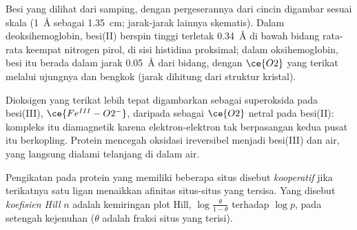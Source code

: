 \begin{omfigure}

{\small Besi  yang dilihat dari samping, dengan pergeserannya dari cincin digambar sesuai
skala (1~\AA{} sebagai 1.35~cm; jarak-jarak lainnya skematis). Dalam deoksihemoglobin, besi(II) berspin tinggi terletak
\qty{0.34}{\angstrom} di bawah bidang rata-rata keempat nitrogen pirol, di sisi
histidina proksimal; dalam oksihemoglobin, besi itu berada dalam jarak \qty{0.05}{\angstrom} dari bidang, dengan $\ce{O2}$
yang terikat melalui ujungnya dan bengkok (jarak dihitung dari struktur kristal).}
\end{omfigure}

Dioksigen yang terikat lebih tepat digambarkan sebagai superoksida pada besi(III), $\ce{Fe^{III}-O2^-}$, daripada
sebagai $\ce{O2}$ netral pada besi(II): kompleks itu diamagnetik karena elektron-elektron
tak berpasangan kedua pusat itu berkopling. Protein mencegah oksidasi
ireversibel menjadi besi(III) dan air, yang langsung dialami  telanjang di dalam
air.

\begin{definition}\label{def:b3:bioinorganic:cooperativity}
Pengikatan pada protein yang memiliki beberapa situs disebut \emph{kooperatif}
jika terikatnya satu ligan menaikkan afinitas situs-situs
yang tersisa. Yang disebut \emph{koefisien Hill} $n$ adalah kemiringan
plot Hill, $\log\frac{\theta}{1 - \theta}$ terhadap $\log p$, pada setengah kejenuhan ($\theta$ adalah fraksi situs
yang terisi).
\end{definition}

